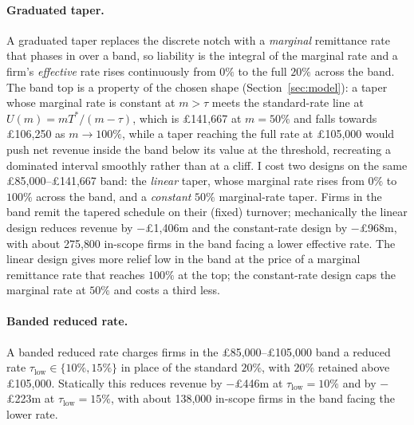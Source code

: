 \paragraph{Graduated taper.} A graduated taper replaces the discrete notch with a
\emph{marginal} remittance rate that phases in over a band, so liability is the
integral of the marginal rate and a firm's \emph{effective} rate rises
continuously from $0\%$ to the full $20\%$ across the band. The band top is a
property of the chosen shape (Section~\ref{sec:model}): a taper whose marginal
rate is constant at $m>\tau$ meets the standard-rate line at
$U(m)=mT^{*}/(m-\tau)$, which is \pounds141{,}667 at $m=50\%$ and falls
towards \pounds106{,}250 as $m\to100\%$, while a taper reaching the full rate at
\pounds105{,}000 would push net revenue inside the band below its value at the
threshold, recreating a dominated interval smoothly rather than at a cliff. I
cost two designs on the same \pounds85{,}000--\pounds141{,}667 band: the
\emph{linear} taper, whose marginal rate rises from $0\%$ to $100\%$ across the
band, and a \emph{constant} $50\%$ marginal-rate taper. Firms in the band remit
the tapered schedule on their (fixed) turnover; mechanically the linear design
reduces revenue by \(-\)\pounds1{,}406m and the constant-rate design by \(-\)\pounds968m, with
about 275{,}800 in-scope firms in the band facing a lower effective rate.
The linear design gives more relief low in the band at the price of a marginal
remittance rate that reaches $100\%$ at the top; the constant-rate design caps
the marginal rate at $50\%$ and costs a third less.

\paragraph{Banded reduced rate.} A banded reduced rate charges firms in the
\pounds85{,}000--\pounds105{,}000 band a reduced rate
$\tau_{\text{low}}\in\{10\%,15\%\}$ in place of the standard $20\%$, with $20\%$
retained above \pounds105{,}000. Statically this reduces revenue by \(-\)\pounds446m
at $\tau_{\text{low}}=10\%$ and by \(-\)\pounds223m at $\tau_{\text{low}}=15\%$,
with about 138{,}000 in-scope firms in the band facing the lower rate.

